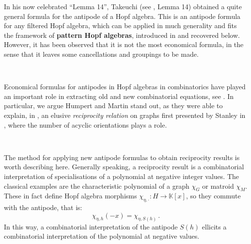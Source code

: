 \documentclass[12pt, reqno]{amsart}
\theoremstyle{definition}
\begin{document}
In his now celebrated  ``Lemma 14'', Takeuchi (see \cite{Takeuchi1971}, Lemma 14) obtained a quite general formula for the antipode of a Hopf algebra. 
This is an antipode formula for any filtered Hopf algebra, which can be applied in much generality and fits the framework of \textbf{pattern Hopf algebras}, introduced in \cite{penaguiao2020algebraic} and recovered below.
However, it has been observed that it is not the most economical formula, in the sense that it leaves some cancellations and groupings to be made.

\

Economical formulas for antipodes in Hopf algebras in combinatorics have played an important role in extracting old and new combinatorial equations, see \cite{Schmitt1993, humpert2012incidence, BS2017, aguiar2017hopf, xu2022cancellation}.
In particular, we argue Humpert and Martin stand out, as they were able to explain, in \cite{humpert2012incidence}, an elusive \textit{reciprocity relation} on graphs first presented by Stanley in \cite{stanley1975combinatorial}, where the number of acyclic orientations plays a role.

\

The method for applying new antipode formulas to obtain reciprocity results is worth describing here.
Generally speaking, a reciprocity result is a combinatorial interpretation of specialisations of a polynomial at negative integer values.
The classical examples are the characteristic polynomial of a graph $\chi_G$ or matroid $\chi_M$.
These in fact define Hopf algebra morphisms $\chi_{\eta, \cdot } : H \to \mathbb{K}[x]$, so they commute with the antipode, that is:
$$\chi_{\eta, h } (-x) = \chi_{\eta, S(h) } \, . $$
In this way, a combinatorial interpretation of the antipode $S(h)$ ellicits a combinatorial interpretation of the polynomial at negative values.

\

\end{document}
